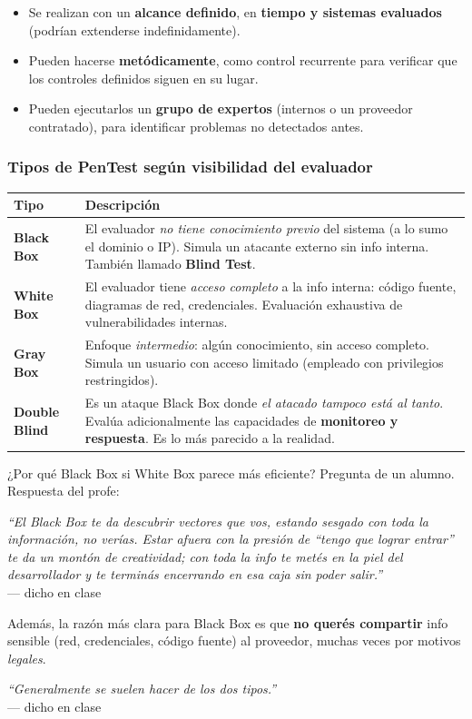 \documentclass[11pt,a4paper]{article}
\newcommand{\prof}[1]{\par\medskip\noindent\textit{``#1''}\\[-2pt]\hspace*{1em}%
  {\footnotesize\textcolor{black!60}{--- dicho en clase}}\par\medskip\noindent}
\begin{document}
\begin{itemize}[leftmargin=1.4em,itemsep=1pt]
  \item Se realizan con un \textbf{alcance definido}, en \textbf{tiempo y sistemas evaluados}
        (podrían extenderse indefinidamente).
  \item Pueden hacerse \textbf{metódicamente}, como control recurrente para verificar que los
        controles definidos siguen en su lugar.
  \item Pueden ejecutarlos un \textbf{grupo de expertos} (internos o un proveedor contratado),
        para identificar problemas no detectados antes.
\end{itemize}

\subsubsection{Tipos de PenTest según visibilidad del evaluador}

\begin{center}
\begin{tabular}{@{}>{\bfseries}p{}p{}@{}}
\toprule
Tipo & Descripción \\
\midrule
Black Box & El evaluador \emph{no tiene conocimiento previo} del sistema (a lo sumo el dominio o
            IP). Simula un atacante externo sin info interna. También llamado \textbf{Blind Test}. \\
White Box & El evaluador tiene \emph{acceso completo} a la info interna: código fuente, diagramas
            de red, credenciales. Evaluación exhaustiva de vulnerabilidades internas. \\
Gray Box & Enfoque \emph{intermedio}: algún conocimiento, sin acceso completo. Simula un usuario
           con acceso limitado (empleado con privilegios restringidos). \\
Double Blind & Es un ataque Black Box donde \emph{el atacado tampoco está al tanto}. Evalúa
               adicionalmente las capacidades de \textbf{monitoreo y respuesta}. Es lo más
               parecido a la realidad. \\
\bottomrule
\end{tabular}
\end{center}

\begin{anecbox}{¿Por qué Black Box si White Box parece más eficiente?}
Pregunta de un alumno. Respuesta del profe: \prof{El Black Box te da descubrir vectores que vos,
estando sesgado con toda la información, no verías. Estar afuera con la presión de ``tengo que
lograr entrar'' te da un montón de creatividad; con toda la info te metés en la piel del
desarrollador y te terminás encerrando en esa caja sin poder salir.} Además, la razón más clara
para Black Box es que \textbf{no querés compartir} info sensible (red, credenciales, código
fuente) al proveedor, muchas veces por motivos \emph{legales}. \prof{Generalmente se suelen hacer
de los dos tipos.}
\end{anecbox}
\end{document}
